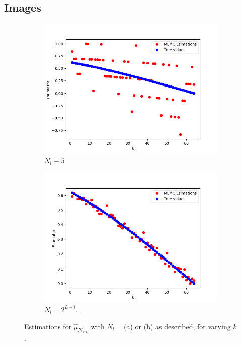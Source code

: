 \documentclass{article}
\begin{document}
\newpage

\subsection{Images}


\begin{figure}[h!]
\begin{center}
  \begin{subfigure}[b]{0.85\linewidth}
    \includegraphics[width=\linewidth]{Question 8 (N=5).png}
    \caption{$N_l \equiv 5$}
  \end{subfigure}
  \begin{subfigure}[b]{0.85\linewidth}
    \includegraphics[width=\linewidth]{Question 8 (N=changing).png}
    \caption{$N_l=2^{L-l}$.}
  \end{subfigure}
  \caption{Estimations for $\hat\mu_{N_{1:L}}$ with $N_l = $(a) or (b) as described, for varying $k$.}
  \label{fig:Q8 Estimators}
\end{center}
\end{figure}
\end{document}
